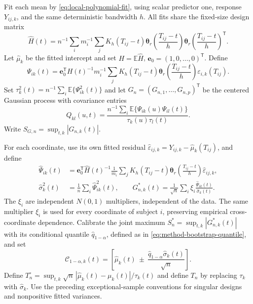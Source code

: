 \documentclass[12pt]{article}
\newcommand{\be}{{\mathbf e}}
\newcommand{\btheta}  {\boldsymbol{\theta}}
\newcommand{\expect}{\mathbb{E}}
\newcommand{\trans}{{\scriptscriptstyle\mathsf{T}}}
\numberwithin{equation}{section}
\begin{document}
Fit each mean by \eqref{eq:local-polynomial-fit}, using scalar predictor
one, response $Y_{ij,k}$, and the same deterministic bandwidth $h$.
All fits share the fixed-size design matrix
\[
\widehat H(t)=n^{-1}\sum_i m_i^{-1}\sum_j K_h(T_{ij}-t)
\btheta_r\!\left(\frac{T_{ij}-t}{h}\right)
\btheta_r\!\left(\frac{T_{ij}-t}{h}\right)^\trans.
\]
Let $\widehat\mu_k$ be the fitted intercept and set
$H=\expect\widehat H$, $\be_0=(1,0,\ldots,0)^\trans$. Define
\[
\Psi_{ik}(t)=\be_0^\trans H(t)^{-1}m_i^{-1}\sum_j
K_h(T_{ij}-t)\btheta_r\!\left(\frac{T_{ij}-t}{h}\right)
\varepsilon_{i,k}(T_{ij}).
\]
Set $\tau_k^2(t)=n^{-1}\sum_i\expect\{\Psi_{ik}^2(t)\}$ and let
$G_n=(G_{n,1},\ldots,G_{n,p})^\trans$ be the centered Gaussian
process with covariance entries
\[
Q_{kl}(u,t)=
\frac{n^{-1}\sum_i\expect\{\Psi_{ik}(u)\Psi_{il}(t)\}}
{\tau_k(u)\tau_l(t)}.
\]
Write $S_{G,n}=\sup_{t,k}|G_{n,k}(t)|$.

For each coordinate, use its own fitted residual
$\widehat\varepsilon_{ij,k}=Y_{ij,k}-\widehat\mu_k(T_{ij})$, and define
\[
\begin{aligned}
\widehat\Psi_{ik}(t)&=\be_0^\trans\widehat H(t)^{-1}\frac1{m_i}\sum_j
K_h(T_{ij}-t)\btheta_r\!\left(\frac{T_{ij}-t}{h}\right)
\widehat\varepsilon_{ij,k},\\
\widehat\sigma_k^2(t)&=\frac1n\sum_i\widehat\Psi_{ik}^2(t),\qquad
G_{n,k}^*(t)=\frac1{\sqrt n}\sum_i\xi_i
\frac{\widehat\Psi_{ik}(t)}{\widehat\sigma_k(t)}.
\end{aligned}
\]
The $\xi_i$ are independent $N(0,1)$ multipliers, independent of the
data. The same multiplier $\xi_i$ is used for every coordinate of
subject $i$, preserving empirical cross-coordinate dependence.
Calibrate the joint maximum $S_n^*=\sup_{t,k}|G_{n,k}^*(t)|$ with
its conditional quantile $\widehat q_{1-\alpha}$, defined as in
\eqref{eq:method-bootstrap-quantile}, and set
\[
\mathcal C_{1-\alpha,k}(t)=
\left[\widehat\mu_k(t)\ \pm\
\frac{\widehat q_{1-\alpha}\widehat\sigma_k(t)}{\sqrt n}\right].
\]
Define $T_n^\circ=\sup_{t,k}\sqrt n\,
|\widehat\mu_k(t)-\mu_k(t)|/\tau_k(t)$ and define $T_n$ by replacing
$\tau_k$ with $\widehat\sigma_k$. Use the preceding exceptional-sample
conventions for singular designs and nonpositive fitted variances.
\end{document}
